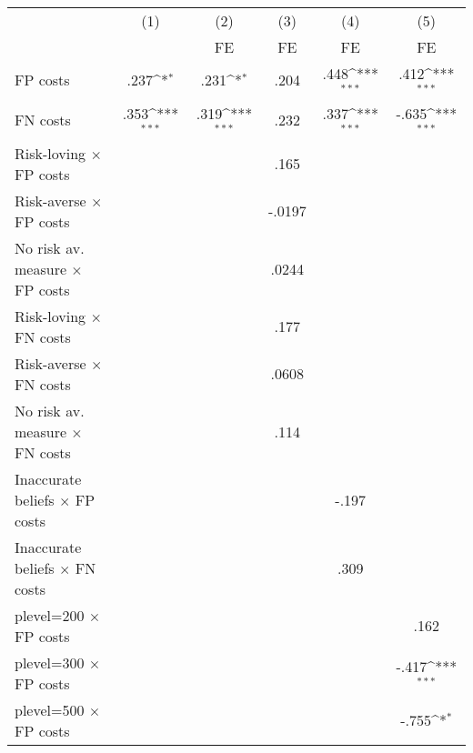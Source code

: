 {
\def\sym#1{\ifmmode^{#1}\else\(^{#1}\)\fi}
\begin{tabular}{l*{5}{c}}
\hline\hline
                &\multicolumn{1}{c}{(1)}&\multicolumn{1}{c}{(2)}&\multicolumn{1}{c}{(3)}&\multicolumn{1}{c}{(4)}&\multicolumn{1}{c}{(5)}\\
                &\multicolumn{1}{c}{}&\multicolumn{1}{c}{FE}&\multicolumn{1}{c}{FE}&\multicolumn{1}{c}{FE}&\multicolumn{1}{c}{FE}\\
\hline
FP costs        &     .237\sym{*}  &     .231\sym{*}  &     .204         &     .448\sym{***}&     .412\sym{***}\\
FN costs        &     .353\sym{***}&     .319\sym{***}&     .232         &     .337\sym{***}&    -.635\sym{***}\\
Risk-loving $\times$ FP costs&                  &                  &     .165         &                  &                  \\
Risk-averse $\times$ FP costs&                  &                  &   -.0197         &                  &                  \\
No risk av. measure $\times$ FP costs&                  &                  &    .0244         &                  &                  \\
Risk-loving $\times$ FN costs&                  &                  &     .177         &                  &                  \\
Risk-averse $\times$ FN costs&                  &                  &    .0608         &                  &                  \\
No risk av. measure $\times$ FN costs&                  &                  &     .114         &                  &                  \\
Inaccurate beliefs $\times$ FP costs&                  &                  &                  &    -.197         &                  \\
Inaccurate beliefs $\times$ FN costs&                  &                  &                  &     .309         &                  \\
plevel=200 $\times$ FP costs&                  &                  &                  &                  &     .162         \\
plevel=300 $\times$ FP costs&                  &                  &                  &                  &    -.417\sym{***}\\
plevel=500 $\times$ FP costs&                  &                  &                  &                  &    -.755\sym{*}  \\

\end{tabular}}
